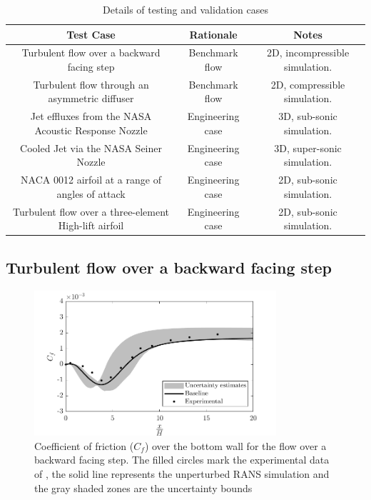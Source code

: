 \begin{table}
\caption{\label{tab:vandv_cases} Details of testing and validation cases}
\begin{center}
\begin{tabular}{ccc}
Test Case& Rationale& Notes \\\hline
Turbulent flow over a backward facing step& Benchmark flow& 2D, incompressible simulation.\\
Turbulent flow through an asymmetric diffuser& Benchmark flow& 2D, compressible simulation.\\
Jet effluxes from the NASA Acoustic Response Nozzle& Engineering case & 3D, sub-sonic simulation.\\
Cooled Jet via the NASA Seiner Nozzle& Engineering case& 3D, super-sonic simulation.\\
NACA 0012 airfoil at a range of angles of attack& Engineering case& 2D, sub-sonic simulation.\\
Turbulent flow over a three-element High-lift airfoil& Engineering case& 2D, sub-sonic simulation.\\
\end{tabular}
\end{center}
\end{table}

\subsection{Turbulent flow over a backward facing step}
\begin{figure}
\centering
\includegraphics[width=0.8\textwidth]{suthesis/images/backstep_cf_bot.png}
\caption{Coefficient of friction ($C_f$) over the bottom wall for the flow over a backward facing step. The filled circles mark the experimental data of \cite{driver1985}, the solid line represents the unperturbed RANS simulation and the gray shaded zones are the uncertainty bounds\label{fig:backstep_cf}}
\end{figure}

